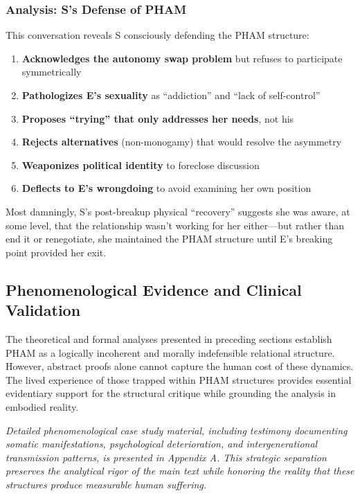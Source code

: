 \documentclass[12pt, letterpaper]{article}
\begin{document}
\subsubsection{Analysis: S's Defense of PHAM}

This conversation reveals S consciously defending the PHAM structure:

\begin{enumerate}
    \item \textbf{Acknowledges the autonomy swap problem} but refuses to participate symmetrically
    \item \textbf{Pathologizes E's sexuality} as ``addiction'' and ``lack of self-control''
    \item \textbf{Proposes ``trying'' that only addresses her needs}, not his
    \item \textbf{Rejects alternatives} (non-monogamy) that would resolve the asymmetry
    \item \textbf{Weaponizes political identity} to foreclose discussion
    \item \textbf{Deflects to E's wrongdoing} to avoid examining her own position
\end{enumerate}

Most damningly, S's post-breakup physical ``recovery'' suggests she was aware, at some level, that the relationship wasn't working for her either---but rather than end it or renegotiate, she maintained the PHAM structure until E's breaking point provided her exit.

\subsection{Phenomenological Evidence and Clinical Validation}

The theoretical and formal analyses presented in preceding sections establish PHAM as a logically incoherent and morally indefensible relational structure. However, abstract proofs alone cannot capture the human cost of these dynamics. The lived experience of those trapped within PHAM structures provides essential evidentiary support for the structural critique while grounding the analysis in embodied reality.

\textit{Detailed phenomenological case study material, including testimony documenting somatic manifestations, psychological deterioration, and intergenerational transmission patterns, is presented in Appendix A. This strategic separation preserves the analytical rigor of the main text while honoring the reality that these structures produce measurable human suffering.}
\end{document}

